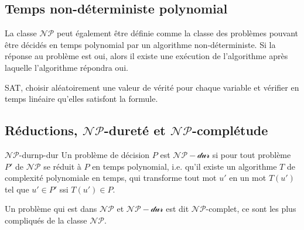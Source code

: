 \subsection{Temps non-déterministe polynomial}
\label{sub:temps_non_deterministe_polynomial}
La classe $\mathcal{NP}$ peut également être définie comme la classe des problèmes pouvant être décidés en temps polynomial
par un algorithme non-déterministe. Si la réponse au problème est oui, alors il existe une exécution de l'algorithme après 
laquelle l'algorithme répondra oui.
\begin{example}
    SAT, choisir aléatoirement une valeur de vérité pour chaque variable et vérifier en temps linéaire qu'elles satisfont
    la formule.
\end{example}

\subsection{Réductions, $\mathcal{NP}$-dureté et $\mathcal{NP}$-complétude}
\label{sub:reductions_np_durete_et_np_completude}
\begin{definition}{$\mathcal{NP}$-dur}{np-dur}
    Un problème de décision $P$ est $\mathcal{NP-dur}$ si pour tout problème $P'$ de $\mathcal{NP}$ se réduit à $P$ en temps
    polynomial, i.e. qu'il existe un algorithme $T$ de complexité polynomiale en temps, qui transforme tout mot $u'$ en un 
    mot $T(u')$ tel que $u'\in P'$ ssi $T(u')\in P$.
\end{definition}
Un problème qui est dans $\mathcal{NP}$ et $\mathcal{NP-dur}$ est dit $\mathcal{NP}$-complet, ce sont les plus compliqués de
la classe $\mathcal{NP}$.

